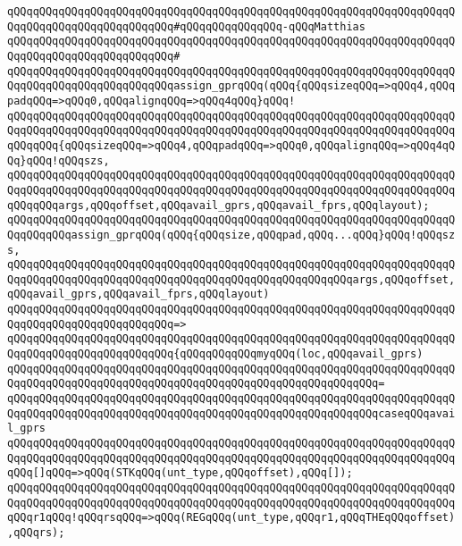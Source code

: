 \verb|qQQqqQQqqQQqqQQqqQQqqQQqqQQqqQQqqQQqqQQqqQQqqQQqqQQqqQQqqQQqqQQqqQQqqQQqqQQqqQQqqQQqqQQqqQQqqQQq#qQQqqQQqqQQqqQQq-qQQqMatthias|\newline
\verb|qQQqqQQqqQQqqQQqqQQqqQQqqQQqqQQqqQQqqQQqqQQqqQQqqQQqqQQqqQQqqQQqqQQqqQQqqQQqqQQqqQQqqQQqqQQqqQQq#|\newline
\verb|qQQqqQQqqQQqqQQqqQQqqQQqqQQqqQQqqQQqqQQqqQQqqQQqqQQqqQQqqQQqqQQqqQQqqQQqqQQqqQQqqQQqqQQqqQQqqQQqassign_gprqQQq(qQQq{qQQqsizeqQQq=>qQQq4,qQQqpadqQQq=>qQQq0,qQQqalignqQQq=>qQQq4qQQq}qQQq!|\newline
\verb|qQQqqQQqqQQqqQQqqQQqqQQqqQQqqQQqqQQqqQQqqQQqqQQqqQQqqQQqqQQqqQQqqQQqqQQqqQQqqQQqqQQqqQQqqQQqqQQqqQQqqQQqqQQqqQQqqQQqqQQqqQQqqQQqqQQqqQQqqQQqqQQqqQQq{qQQqsizeqQQq=>qQQq4,qQQqpadqQQq=>qQQq0,qQQqalignqQQq=>qQQq4qQQq}qQQq!qQQqszs,|\newline
\verb|qQQqqQQqqQQqqQQqqQQqqQQqqQQqqQQqqQQqqQQqqQQqqQQqqQQqqQQqqQQqqQQqqQQqqQQqqQQqqQQqqQQqqQQqqQQqqQQqqQQqqQQqqQQqqQQqqQQqqQQqqQQqqQQqqQQqqQQqqQQqqQQqqQQqargs,qQQqoffset,qQQqavail_gprs,qQQqavail_fprs,qQQqlayout);|\newline
\newline
\verb|qQQqqQQqqQQqqQQqqQQqqQQqqQQqqQQqqQQqqQQqqQQqqQQqqQQqqQQqqQQqqQQqqQQqqQQqqQQqqQQqassign_gprqQQq(qQQq{qQQqsize,qQQqpad,qQQq...qQQq}qQQq!qQQqszs,|\newline
\verb|qQQqqQQqqQQqqQQqqQQqqQQqqQQqqQQqqQQqqQQqqQQqqQQqqQQqqQQqqQQqqQQqqQQqqQQqqQQqqQQqqQQqqQQqqQQqqQQqqQQqqQQqqQQqqQQqqQQqqQQqqQQqargs,qQQqoffset,qQQqavail_gprs,qQQqavail_fprs,qQQqlayout)|\newline
\verb|qQQqqQQqqQQqqQQqqQQqqQQqqQQqqQQqqQQqqQQqqQQqqQQqqQQqqQQqqQQqqQQqqQQqqQQqqQQqqQQqqQQqqQQqqQQqqQQq=>|\newline
\verb|qQQqqQQqqQQqqQQqqQQqqQQqqQQqqQQqqQQqqQQqqQQqqQQqqQQqqQQqqQQqqQQqqQQqqQQqqQQqqQQqqQQqqQQqqQQqqQQq{qQQqqQQqqQQqmyqQQq(loc,qQQqavail_gprs)|\newline
\verb|qQQqqQQqqQQqqQQqqQQqqQQqqQQqqQQqqQQqqQQqqQQqqQQqqQQqqQQqqQQqqQQqqQQqqQQqqQQqqQQqqQQqqQQqqQQqqQQqqQQqqQQqqQQqqQQqqQQqqQQqqQQqqQQq=|\newline
\verb|qQQqqQQqqQQqqQQqqQQqqQQqqQQqqQQqqQQqqQQqqQQqqQQqqQQqqQQqqQQqqQQqqQQqqQQqqQQqqQQqqQQqqQQqqQQqqQQqqQQqqQQqqQQqqQQqqQQqqQQqqQQqqQQqcaseqQQqavail_gprs|\newline
\verb|qQQqqQQqqQQqqQQqqQQqqQQqqQQqqQQqqQQqqQQqqQQqqQQqqQQqqQQqqQQqqQQqqQQqqQQqqQQqqQQqqQQqqQQqqQQqqQQqqQQqqQQqqQQqqQQqqQQqqQQqqQQqqQQqqQQqqQQqqQQqqQQq[]qQQq=>qQQq(STKqQQq(unt_type,qQQqoffset),qQQq[]);|\newline
\verb|qQQqqQQqqQQqqQQqqQQqqQQqqQQqqQQqqQQqqQQqqQQqqQQqqQQqqQQqqQQqqQQqqQQqqQQqqQQqqQQqqQQqqQQqqQQqqQQqqQQqqQQqqQQqqQQqqQQqqQQqqQQqqQQqqQQqqQQqqQQqqQQqr1qQQq!qQQqrsqQQq=>qQQq(REGqQQq(unt_type,qQQqr1,qQQqTHEqQQqoffset),qQQqrs);|\newline
